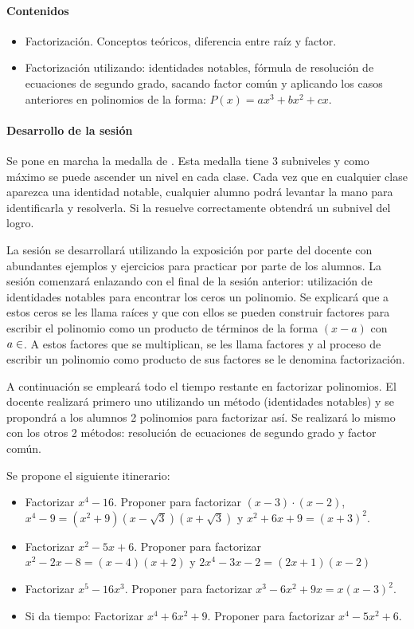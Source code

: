 \paragraph{Contenidos}
\begin{itemize}
	\item Factorización. Conceptos teóricos, diferencia entre raíz y factor.
	\item Factorización utilizando: identidades notables, fórmula de resolución de ecuaciones de segundo grado, sacando factor común y aplicando los casos anteriores en polinomios de la forma: $P(x) = ax^3+bx^2+cx$.
\end{itemize}

\paragraph{Desarrollo de la sesión}

Se pone en marcha la medalla de .
%
Esta medalla tiene 3 subniveles y como máximo se puede ascender un nivel en cada clase.
%
Cada vez que en cualquier clase aparezca una identidad notable, cualquier alumno podrá levantar la mano para identificarla y resolverla. 
%
Si la resuelve correctamente obtendrá un subnivel del logro.

La sesión se desarrollará utilizando la exposición por parte del docente con abundantes ejemplos y ejercicios para practicar por parte de los alumnos.
%
La sesión comenzará enlazando con el final de la sesión anterior: utilización de identidades notables para encontrar los ceros un polinomio.
%
Se explicará que a estos ceros se les llama raíces y que con ellos se pueden construir factores para escribir el polinomio como un producto de términos de la forma $(x-a)$ con $a\in\real$.
%
A estos factores que se multiplican, se les llama factores y al proceso de escribir un polinomio como producto de sus factores se le denomina factorización.

A continuación se empleará todo el tiempo restante en factorizar polinomios.
%
El docente realizará primero uno utilizando un método (identidades notables) y se propondrá a los alumnos 2 polinomios para factorizar así.
%
Se realizará lo mismo con los otros 2 métodos: resolución de ecuaciones de segundo grado y factor común.

Se propone el siguiente itinerario:

\begin{itemize}
	\item Factorizar $x^4-16$. Proponer para factorizar $(x-3)·(x-2)$,$x^4-9 = (x^2+9)(x-\sqrt{3})(x+\sqrt{3})$ y $x^2+6x+9 = (x+3)^2$.
	
	\item Factorizar $x^2-5x+6$. Proponer para factorizar $x^2-2x-8 = (x-4)(x+2)$ y $2x^4-3x-2 = (2x+1)(x-2)$
	\item Factorizar $x^5-16x^3$. Proponer para factorizar $x^3-6x^2+9x = x(x-3)^2$.
	\item Si da tiempo: Factorizar $x^4+6x^2+9$. Proponer para factorizar $x^4-5x^2+6$.
\end{itemize}




